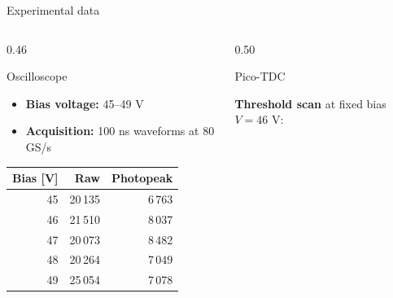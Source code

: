 \begin{frame}{Experimental data}

\small

\vspace{-0.8cm}

\begin{columns}[T,totalwidth=\textwidth]

\begin{column}{0.46\textwidth}

\begin{block}{Oscilloscope}

\begin{itemize}
    \item \textbf{Bias voltage:} 45--49 V
    \item \textbf{Acquisition:} 100 ns waveforms at 80 GS/s
\end{itemize}

\vspace{-0.5em}

\begin{table}
\centering
\scriptsize
\setlength{\tabcolsep}{4pt}

\vspace{-0.5em}


\begin{tabular}{rrr}
\toprule
\textbf{Bias [V]} & \textbf{Raw} & \textbf{Photopeak} \\
\midrule
45 & 20\,135 & 6\,763 \\
46 & 21\,510 & 8\,037 \\
47 & 20\,073 & 8\,482 \\
48 & 20\,264 & 7\,049 \\
49 & 25\,054 & 7\,078 \\
\bottomrule
\end{tabular}

\end{table}

\end{block}

\end{column}

\begin{column}{0.50\textwidth}

\begin{block}{Pico-TDC}

\textbf{Threshold scan} at fixed bias $V=46$ V:

\vspace{-0.5em}


\end{block}
\end{column}
\end{columns}
\end{frame}
